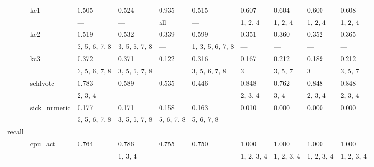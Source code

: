 \documentclass{article}
\begin{document}
\begin{center}
\begin{longtable}{p{1.2cm}p{1.8cm}p{1cm}p{1cm}p{1cm}p{1cm}p{1cm}p{1cm}p{1cm}p{1cm}}
             & kc1          & 0.505            & 0.524            & 0.935            & 0.515            & 0.607      & 0.604         & 0.600         & 0.608         \\
             &              & ---              & ---              & all              & ---              & 1, 2, 4    & 1, 2, 4       & 1, 2, 4       & 1, 2, 4       \\
             & kc2          & 0.519            & 0.532            & 0.339            & 0.599            & 0.351      & 0.360         & 0.352         & 0.365         \\
             &              & 3, 5, 6, 7, 8    & 3, 5, 6, 7, 8    & ---              & 1, 3, 5, 6, 7, 8 & ---        & ---           & ---           & ---           \\
             & kc3          & 0.372            & 0.371            & 0.122            & 0.316            & 0.167      & 0.212         & 0.189         & 0.212         \\
             &              & 3, 5, 6, 7, 8    & 3, 5, 6, 7, 8    & ---              & 3, 5, 6, 7, 8    & 3          & 3, 5, 7       & 3             & 3, 5, 7       \\
             & schlvote     & 0.783            & 0.589            & 0.535            & 0.446            & 0.848      & 0.762         & 0.848         & 0.848         \\
             &              & 2, 3, 4          & ---              & ---              & ---              & 2, 3, 4    & 3, 4          & 2, 3, 4       & 2, 3, 4       \\
             & sick\_numeric & 0.177            & 0.171            & 0.158            & 0.163            & 0.010      & 0.000         & 0.000         & 0.000         \\
             &              & 3, 5, 6, 7, 8    & 3, 5, 6, 7, 8    & 5, 6, 7, 8       & 5, 6, 7, 8       & ---        & ---           & ---           & ---           \\
 recall      &              &                  &                  &                  &                  &            &               &               &               \\
             & cpu\_act      & 0.764            & 0.786            & 0.755            & 0.750            & 1.000      & 1.000         & 1.000         & 1.000         \\
             &              & ---              & 1, 3, 4          & ---              & ---              & 1, 2, 3, 4 & 1, 2, 3, 4    & 1, 2, 3, 4    & 1, 2, 3, 4    \\

\end{longtable}
\end{center}
\end{document}
